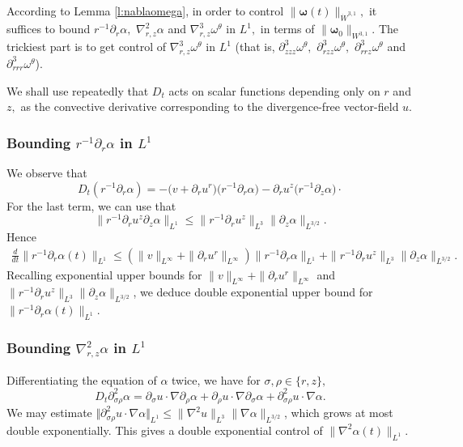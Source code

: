 \documentclass[11pt]{amsart}
\numberwithin{equation}{section}
\newcommand{\nrm}[1]{\Vert#1\Vert}
\def\d{\partial}
\newcommand{\alp}{\alpha}
\newcommand{\bfomg}{{\boldsymbol{\omega}}}
\begin{document}
 
 
According to Lemma \ref{l:nablaomega}, in order  to control 
 $\|\bfomg(t)\|_{\dot W^{3,1}},$
it suffices to bound  $r^{-1}\d_r\alpha,$ 
$\nabla^2_{r,z}\alpha$ and $\nabla^3_{r,z}\omega^\theta$ in $L^1,$ in terms of $\|\bfomg_0\|_{W^{3,1}}.$
The trickiest part is to get control of $\nabla^3_{r,z}\omega^\theta$ in $L^1$ (that is,  $\d^3_{zzz}\omega^\theta,$  $\d^3_{rzz}\omega^\theta,$  $\d^3_{rrz}\omega^\theta$ and  $\d^3_{rrr}\omega^\theta$). 

We shall use repeatedly that $D_t$ acts on scalar functions depending only on $r$ and $z,$ as the convective
derivative corresponding to the divergence-free vector-field $u.$ 


\subsubsection*{Bounding  $r^{-1}\d_r\alpha$ in $L^1$} We observe that 
	$$	D_t(r^{-1}\d_r\alpha)=-\bigl(v+\d_r u^r\bigr)\bigl(r^{-1}\d_r\alpha\bigr)
	-\d_ru^z \bigl(r^{-1}\d_z\alpha\bigr)\cdotp$$
For the last term, we can use that
$$\|r^{-1}\d_r u^z\d_z\alp\|_{L^1}\leq \|r^{-1}\d_r u^z\|_{L^3}\|\d_z\alpha\|_{L^{3/2}}.$$
	Hence 
	\begin{align*}
	\frac{d}{dt} \|r^{-1}\d_r\alpha(t)\|_{L^1}\leq (\|v\|_{L^\infty}+\|\d_r u^r\|_{L^\infty})\|r^{-1}\d_r\alpha\|_{L^1} + \|r^{-1}\d_r u^z\|_{L^3}\|\d_z\alpha\|_{L^{3/2}}. \end{align*}
Recalling exponential upper bounds for $\|v\|_{L^\infty}+\|\d_r u^r\|_{L^\infty}$ and  $\|r^{-1}\d_r u^z\|_{L^3}\|\d_z\alpha\|_{L^{3/2}}$, we deduce double exponential upper bound for $\|r^{-1}\d_r\alpha(t)\|_{L^1}$. 
 
\subsubsection*{Bounding  $\nabla^2_{r,z}\alpha$ in $L^1$}
Differentiating the equation of $\alpha$ twice, we have for $\sigma,\rho\in\{r,z\},$ 
$$
D_t\d^2_{\sigma\rho}\alpha = \d_\sigma u\cdot\nabla\d_\rho\alpha+\d_\rho u\cdot\nabla\d_\sigma\alpha
+\d^2_{\sigma\rho}u\cdot\nabla\alpha.$$ We may estimate $\nrm{\d^2_{\sigma\rho}u\cdot\nabla\alpha}_{L^{1}} \le \|\nabla^2 u\|_{L^3}\|\nabla \alpha\|_{L^{3/2}}$, which grows at most double exponentially. This gives a double exponential control of $\|\nabla^2\alpha(t)\|_{L^1}.$ 
\end{document}
